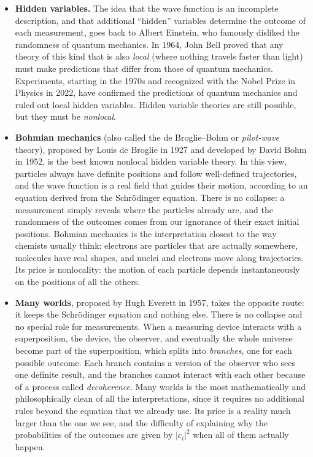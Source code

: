 \documentclass[
  english,
  9pt,
]{extbook}
\theoremstyle{definition}
\theoremstyle{definition}
\theoremstyle{definition}
\theoremstyle{definition}
\theoremstyle{remark}
\begin{document}
\begin{itemize}
\item
  \textbf{Hidden variables.} The idea that the wave function is an incomplete description, and that additional ``hidden'' variables determine the outcome of each measurement, goes back to Albert Einstein, who famously disliked the randomness of quantum mechanics. In 1964, John Bell proved that any theory of this kind that is also \emph{local} (where nothing travels faster than light) must make predictions that differ from those of quantum mechanics. Experiments, starting in the 1970s and recognized with the Nobel Prize in Physics in 2022, have confirmed the predictions of quantum mechanics and ruled out local hidden variables. Hidden variable theories are still possible, but they must be \emph{nonlocal}.
\item
  \textbf{Bohmian mechanics} (also called the de Broglie--Bohm or \emph{pilot-wave} theory), proposed by Louis de Broglie in 1927 and developed by David Bohm in 1952, is the best known nonlocal hidden variable theory. In this view, particles always have definite positions and follow well-defined trajectories, and the wave function is a real field that guides their motion, according to an equation derived from the Schrödinger equation. There is no collapse: a measurement simply reveals where the particles already are, and the randomness of the outcomes comes from our ignorance of their exact initial positions. Bohmian mechanics is the interpretation closest to the way chemists usually think: electrons are particles that are actually somewhere, molecules have real shapes, and nuclei and electrons move along trajectories. Its price is nonlocality: the motion of each particle depends instantaneously on the positions of all the others.
\item
  \textbf{Many worlds}, proposed by Hugh Everett in 1957, takes the opposite route: it keeps the Schrödinger equation and nothing else. There is no collapse and no special role for measurements. When a measuring device interacts with a superposition, the device, the observer, and eventually the whole universe become part of the superposition, which splits into \emph{branches}, one for each possible outcome. Each branch contains a version of the observer who sees one definite result, and the branches cannot interact with each other because of a process called \emph{decoherence}. Many worlds is the most mathematically and philosophically clean of all the interpretations, since it requires no additional rules beyond the equation that we already use. Its price is a reality much larger than the one we see, and the difficulty of explaining why the probabilities of the outcomes are given by \(|c_i|^2\) when all of them actually happen.

\end{itemize}
\end{document}
